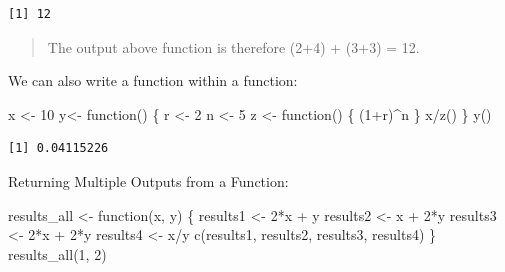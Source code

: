 \documentclass[
  letterpaper,
  DIV=11,
  numbers=noendperiod]{scrreprt}
\newenvironment{Shaded}{\begin{snugshade}}{\end{snugshade}}
\newcommand{\ControlFlowTok}[1]{\textcolor[rgb]{0.00,0.23,0.31}{#1}}
\newcommand{\DecValTok}[1]{\textcolor[rgb]{0.68,0.00,0.00}{#1}}
\newcommand{\FunctionTok}[1]{\textcolor[rgb]{0.28,0.35,0.67}{#1}}
\newcommand{\NormalTok}[1]{\textcolor[rgb]{0.00,0.23,0.31}{#1}}
\newcommand{\OtherTok}[1]{\textcolor[rgb]{0.00,0.23,0.31}{#1}}
\newcommand{\SpecialCharTok}[1]{\textcolor[rgb]{0.37,0.37,0.37}{#1}}
\begin{document}
\begin{verbatim}
[1] 12
\end{verbatim}

\begin{quote}
The output above function is therefore (2+4) + (3+3) = 12.
\end{quote}

We can also write a function within a function:

\begin{Shaded}
\begin{Highlighting}[]
\NormalTok{x }\OtherTok{\textless{}{-}} \DecValTok{10} 
\NormalTok{y}\OtherTok{\textless{}{-}} \ControlFlowTok{function}\NormalTok{() \{}
\NormalTok{        r }\OtherTok{\textless{}{-}} \DecValTok{2}
\NormalTok{        n }\OtherTok{\textless{}{-}} \DecValTok{5}
\NormalTok{        z }\OtherTok{\textless{}{-}} \ControlFlowTok{function}\NormalTok{() \{}
\NormalTok{                (}\DecValTok{1}\SpecialCharTok{+}\NormalTok{r)}\SpecialCharTok{\^{}}\NormalTok{n}
\NormalTok{        \}}
\NormalTok{        x}\SpecialCharTok{/}\FunctionTok{z}\NormalTok{()}
\NormalTok{\}}
\FunctionTok{y}\NormalTok{()}
\end{Highlighting}
\end{Shaded}

\begin{verbatim}
[1] 0.04115226
\end{verbatim}

Returning Multiple Outputs from a Function:

\begin{Shaded}
\begin{Highlighting}[]
\NormalTok{results\_all }\OtherTok{\textless{}{-}} \ControlFlowTok{function}\NormalTok{(x, y) \{}
\NormalTok{        results1 }\OtherTok{\textless{}{-}} \DecValTok{2}\SpecialCharTok{*}\NormalTok{x }\SpecialCharTok{+}\NormalTok{ y}
\NormalTok{        results2 }\OtherTok{\textless{}{-}}\NormalTok{ x }\SpecialCharTok{+} \DecValTok{2}\SpecialCharTok{*}\NormalTok{y}
\NormalTok{        results3 }\OtherTok{\textless{}{-}} \DecValTok{2}\SpecialCharTok{*}\NormalTok{x }\SpecialCharTok{+} \DecValTok{2}\SpecialCharTok{*}\NormalTok{y}
\NormalTok{        results4 }\OtherTok{\textless{}{-}}\NormalTok{ x}\SpecialCharTok{/}\NormalTok{y}
        \FunctionTok{c}\NormalTok{(results1, results2, results3, results4)}
\NormalTok{\}}
\FunctionTok{results\_all}\NormalTok{(}\DecValTok{1}\NormalTok{, }\DecValTok{2}\NormalTok{)}
\end{Highlighting}
\end{Shaded}
\end{document}
